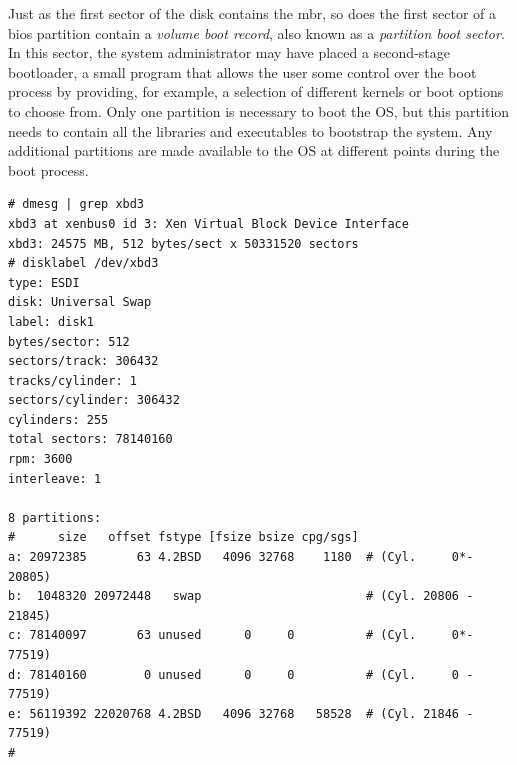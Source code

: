 Just as the first sector of the disk contains the
\gls{mbr}, so does the first sector of a \gls{bios}
partition contain a {\em volume boot
record}, also known as a
{\em partition boot sector}.  In this sector, the system administrator may
have placed a second-stage
bootloader, a small program that
allows the user some control over the boot process by
providing, for example, a selection of different
kernels or boot options to choose from.  Only one
partition is necessary to boot the OS, but this
partition needs to contain all the libraries and
executables to bootstrap the system.  Any additional
partitions are made available to the OS at different
points during the boot process.

\begin{lstlisting}[basicstyle=\scriptsize,float,label=code:disklabel,caption=disklabel(8)
invocation and output on a NetBSD system]
# dmesg | grep xbd3
xbd3 at xenbus0 id 3: Xen Virtual Block Device Interface
xbd3: 24575 MB, 512 bytes/sect x 50331520 sectors
# disklabel /dev/xbd3
type: ESDI
disk: Universal Swap
label: disk1
bytes/sector: 512
sectors/track: 306432
tracks/cylinder: 1
sectors/cylinder: 306432
cylinders: 255
total sectors: 78140160
rpm: 3600
interleave: 1

8 partitions:
#      size   offset fstype [fsize bsize cpg/sgs]
a: 20972385       63 4.2BSD   4096 32768    1180  # (Cyl.     0*- 20805)
b:  1048320 20972448   swap                       # (Cyl. 20806 - 21845)
c: 78140097       63 unused      0     0          # (Cyl.     0*- 77519)
d: 78140160        0 unused      0     0          # (Cyl.     0 - 77519)
e: 56119392 22020768 4.2BSD   4096 32768   58528  # (Cyl. 21846 - 77519)
#
\end{lstlisting}


